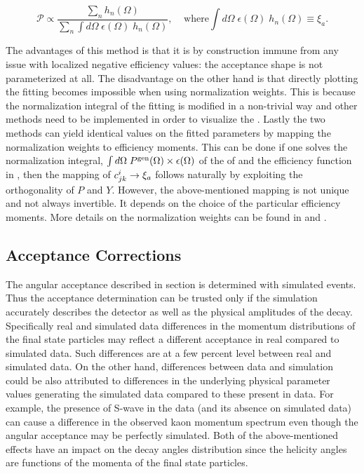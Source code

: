 \begin{equation}
  \mathcal{P} \propto \frac{\sum_n h_n(\Omega)}{\sum_n \int d\Omega \; \epsilon(\Omega) \; h_n(\Omega)}, \;\;\;\;\text{where} \int d\Omega \; \epsilon(\Omega) \; h_n(\Omega) \equiv \xi_a .
  \label{norm_weights_pdf}
\end{equation}

The advantages of this method is that it is by construction immune from any issue with localized negative efficiency values:
the acceptance shape is not parameterized at all. The disadvantage on the other hand is that directly
plotting the fitting \pdf becomes impossible when using normalization weights. This is because the normalization integral
of the fitting \pdf is modified in a non-trivial way and other methods need to be implemented in order to visualize the \pdf.
Lastly the two methods can yield identical values on the
fitted parameters by mapping the normalization weights to efficiency moments. This can be done if one solves the normalization integral,
$\int d\Omega\;{P^{\text{gen}}(\Omega)}\times\epsilon(\Omega)$ of the \pdf of  and the efficiency function in ,
then the mapping of $c^{i}_{jk} \rightarrow \xi_a$ follows naturally by exploiting the orthogonality of $P$ and $Y$.
However, the above-mentioned mapping is not unique and not always invertible. It depends on the choice of the particular
efficiency moments. More details on the normalization weights can be found in \cite{jeroenThesis} and \cite{tristanThesis}.

\subsection{Acceptance Corrections}
\label{Accceptance_Corrections}
The angular acceptance described in section  is determined with simulated \BsJpsiKst events.
Thus the acceptance determination can be trusted only if the simulation accurately describes the detector as well as the
physical amplitudes of the \BsJpsiKst decay. Specifically real and simulated data differences in the momentum distributions
of the final state particles may reflect a different acceptance in real compared to simulated data.
Such differences are at a few percent level between real and simulated data.
On the other hand, differences between data and simulation could be also attributed to
differences in the underlying physical parameter values generating the simulated data compared to these
present in data. For example, the presence of S-wave in the data (and its absence on simulated data)
can cause a difference in the observed kaon momentum spectrum even though the angular acceptance may be perfectly simulated.
Both of the above-mentioned effects have an impact on the decay angles distribution since the helicity angles are functions
of the momenta of the final state particles.

